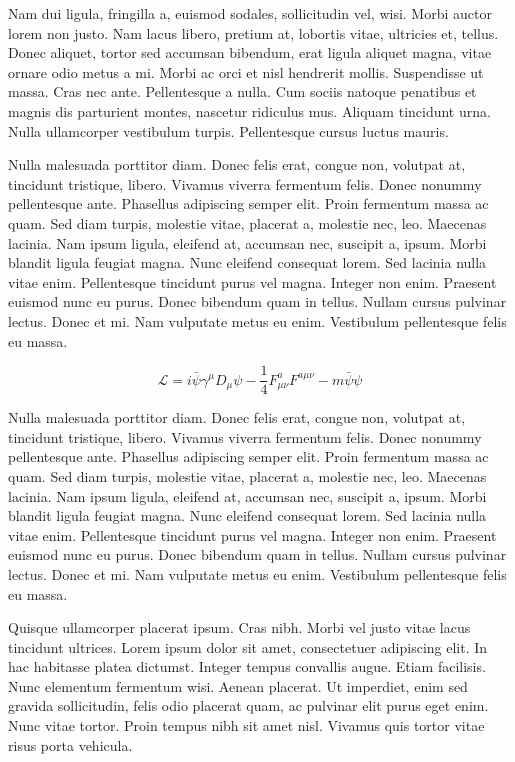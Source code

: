 \documentclass[APA,LATO1COL]{WileyNJD-v2}
\begin{document}
Nam dui ligula, fringilla a, euismod sodales, sollicitudin vel, wisi. Morbi auctor lorem non justo. Nam lacus libero,
pretium at, lobortis vitae, ultricies et, tellus. Donec aliquet, tortor sed accumsan bibendum, erat ligula aliquet magna,
vitae ornare odio metus a mi. Morbi ac orci et nisl hendrerit mollis. Suspendisse ut massa. Cras nec ante. Pellentesque
a nulla. Cum sociis natoque penatibus et magnis dis parturient montes, nascetur ridiculus mus. Aliquam tincidunt
urna. Nulla ullamcorper vestibulum turpis. Pellentesque cursus luctus mauris.

Nulla malesuada porttitor diam. Donec felis erat, congue non, volutpat at, tincidunt tristique, libero. Vivamus
viverra fermentum felis. Donec nonummy pellentesque ante. Phasellus adipiscing semper elit. Proin fermentum massa
ac quam. Sed diam turpis, molestie vitae, placerat a, molestie nec, leo. Maecenas lacinia. Nam ipsum ligula, eleifend
at, accumsan nec, suscipit a, ipsum. Morbi blandit ligula feugiat magna. Nunc eleifend consequat lorem. Sed lacinia
nulla vitae enim. Pellentesque tincidunt purus vel magna. Integer non enim. Praesent euismod nunc eu purus. Donec
bibendum quam in tellus. Nullam cursus pulvinar lectus. Donec et mi. Nam vulputate metus eu enim. Vestibulum
pellentesque felis eu massa.


\begin{equation}
\mathcal{L} = i \bar{\psi} \gamma^\mu D_\mu \psi
    - \frac{1}{4} F_{\mu\nu}^a F^{a\mu\nu} - m \bar{\psi} \psi
\label{eq26}
\end{equation}

Nulla malesuada porttitor diam. Donec felis erat, congue non, volutpat at, tincidunt tristique, libero. Vivamus
viverra fermentum felis. Donec nonummy pellentesque ante. Phasellus adipiscing semper elit. Proin fermentum massa
ac quam. Sed diam turpis, molestie vitae, placerat a, molestie nec, leo. Maecenas lacinia. Nam ipsum ligula, eleifend
at, accumsan nec, suscipit a, ipsum. Morbi blandit ligula feugiat magna. Nunc eleifend consequat lorem. Sed lacinia
nulla vitae enim. Pellentesque tincidunt purus vel magna. Integer non enim. Praesent euismod nunc eu purus. Donec
bibendum quam in tellus. Nullam cursus pulvinar lectus. Donec et mi. Nam vulputate metus eu enim. Vestibulum
pellentesque felis eu massa.

Quisque ullamcorper placerat ipsum. Cras nibh. Morbi vel justo vitae lacus tincidunt ultrices. Lorem ipsum dolor sit
amet, consectetuer adipiscing elit. In hac habitasse platea dictumst. Integer tempus convallis augue. Etiam facilisis.
Nunc elementum fermentum wisi. Aenean placerat. Ut imperdiet, enim sed gravida sollicitudin, felis odio placerat
quam, ac pulvinar elit purus eget enim. Nunc vitae tortor. Proin tempus nibh sit amet nisl. Vivamus quis tortor
vitae risus porta vehicula.
\end{document}
